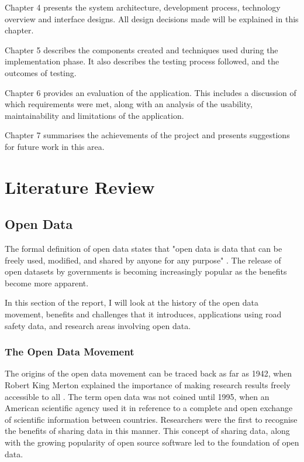 \documentclass[authoryearcitations]{UoYCSproject}
\begin{document}
Chapter 4 presents the system architecture, development process, technology overview and interface designs. All design decisions made will be explained in this chapter.

Chapter 5 describes the components created and techniques used during the implementation phase. It also describes the testing process followed, and the outcomes of testing.

Chapter 6 provides an evaluation of the application. This includes a discussion of which requirements were met, along with an analysis of the usability, maintainability and limitations of the application.

Chapter 7 summarises the achievements of the project and presents suggestions for future work in this area.

\chapter{Literature Review}

\section{Open Data}

The formal definition of open data states that "open data is data that can be freely used, modified, and shared by anyone for any purpose" \citep{OpenKnowledge}. The release of open datasets by governments is becoming increasingly popular as the benefits become more apparent.

In this section of the report, I will look at the history of the open data movement, benefits and challenges that it introduces, applications using road safety data, and research areas involving open data.

\subsection{The Open Data Movement}

The origins of the open data movement can be traced back as far as 1942, when Robert King Merton explained the importance of making research results freely accessible to all \citep{Chignard2013}. The term open data was not coined until 1995, when an American scientific agency used it in reference to a complete and open exchange of scientific information between countries. Researchers were the first to recognise the benefits of sharing data in this manner. This concept of sharing data, along with the growing popularity of open source software led to the foundation of open data.
\end{document}
